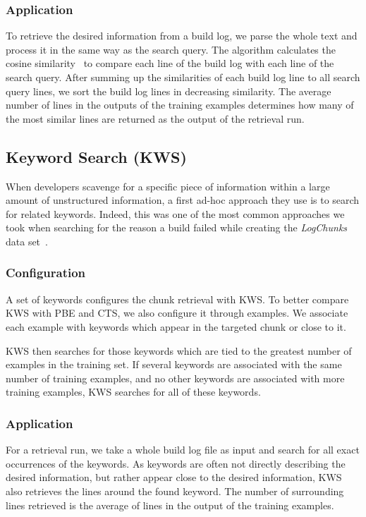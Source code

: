 \subsubsection{Application}
To retrieve the desired information from a build log, we parse the
whole text and process it in the same way as the search query.
The algorithm calculates the cosine
similarity~\cite{korenius2007principal} to compare each line of the
build log with each line of the search query.
After summing up the
similarities of each build log line to all search query lines, we sort
the build log lines in decreasing similarity.
The average number of
lines in the outputs of the training examples determines how many of
the most similar lines are returned as the output of the retrieval
run.

\subsection{Keyword Search (KWS)}
When developers scavenge for a specific piece of information within a
large amount of unstructured information, a first ad-hoc approach they
use is to search for related keywords.
Indeed, this was one of the
most common approaches we took when searching for the reason a build
failed while creating the \emph{LogChunks} data
set~\cite{brandt2020logchunks}.

\subsubsection{Configuration}
A set of keywords configures the chunk retrieval with KWS\@.
To better
compare KWS with PBE and CTS, we also configure it through examples.
We associate each example with keywords which appear in the targeted
chunk or close to it.

KWS then searches for those keywords which are tied to the greatest
number of examples in the training set.
If several keywords are associated with the same number of training
examples, and no other keywords are associated with more training
examples, KWS searches for all of these keywords.

\subsubsection{Application}
For a retrieval run, we take a whole build log file as input and
search for all exact occurrences of the keywords.
As keywords are
often not directly describing the desired information, but rather
appear close to the desired information, KWS also retrieves the lines
around the found keyword.
The number of surrounding lines retrieved is
the average of lines in the output of the training examples.


